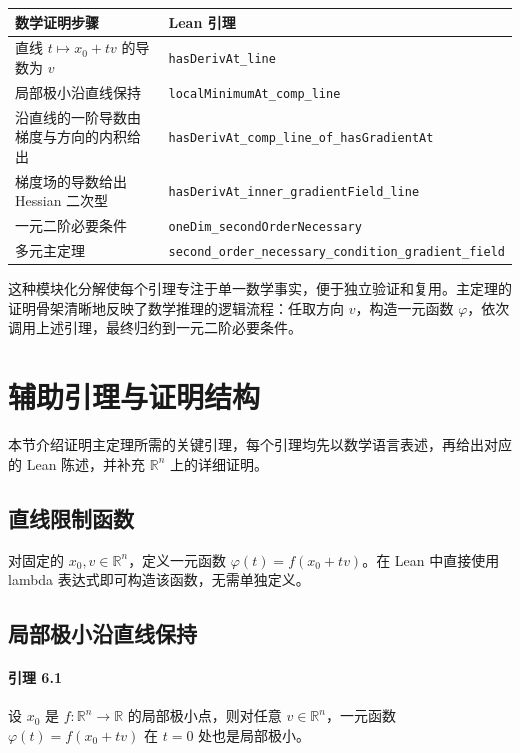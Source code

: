 ﻿\documentclass[UTF8,a4paper,zihao=-4]{ctexart}
\begin{document}
\begin{center}
\begin{tabularx}{\textwidth}{@{}p{}X@{}}
\toprule
数学证明步骤 & Lean 引理 \\
\midrule
直线 \(t \mapsto x_0 + t v\) 的导数为 \(v\) & \texttt{hasDerivAt\_line} \\
局部极小沿直线保持 & \texttt{localMinimumAt\_comp\_line} \\
沿直线的一阶导数由梯度与方向的内积给出 & \texttt{hasDerivAt\_comp\_line\_of\_hasGradientAt} \\
梯度场的导数给出 Hessian 二次型 & \texttt{hasDerivAt\_inner\_gradientField\_line} \\
一元二阶必要条件 & \texttt{oneDim\_secondOrderNecessary} \\
多元主定理 & \texttt{second\_order\_necessary\_condition\_gradient\_field} \\
\bottomrule
\end{tabularx}
\end{center}

这种模块化分解使每个引理专注于单一数学事实，便于独立验证和复用。主定理的证明骨架清晰地反映了数学推理的逻辑流程：任取方向 \(v\)，构造一元函数 \(\varphi\)，依次调用上述引理，最终归约到一元二阶必要条件。

\section{辅助引理与证明结构}
本节介绍证明主定理所需的关键引理，每个引理均先以数学语言表述，再给出对应的 Lean 陈述，并补充 \(\mathbb{R}^n\) 上的详细证明。

\subsection{直线限制函数}
对固定的 \(x_0, v\in\mathbb{R}^n\)，定义一元函数 \(\varphi(t) = f(x_0+tv)\)。在 Lean 中直接使用 lambda 表达式即可构造该函数，无需单独定义。

\subsection{局部极小沿直线保持}
\paragraph{引理 6.1}设 \(x_0\) 是 \(f:\mathbb{R}^n\to\mathbb{R}\) 的局部极小点，则对任意 \(v\in\mathbb{R}^n\)，一元函数 \(\varphi(t)=f(x_0+tv)\) 在 \(t=0\) 处也是局部极小。
\end{document}
